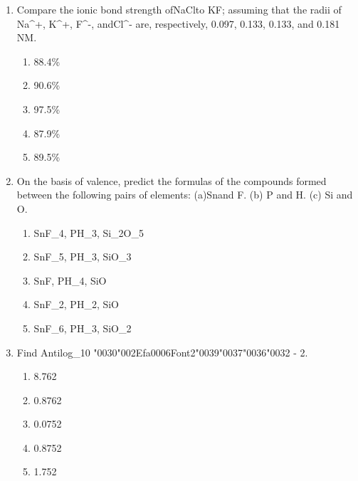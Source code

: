 \documentclass[12pt]{article}
\begin{document}
\begin{enumerate}[label=\arabic*.]
\begin{enumerate}[label=(\alph*)]
    \item T-shaped
    \item Trigonal planar
    \item Trigonal bipyramidal
\end{enumerate}
\item Compare the ionic bond strength ofNaClto KF; assuming that the radii of Na\^{}+, K\^{}+, F\^{}-,
andCl\^{}- are, respectively, 0.097, 0.133, 0.133, and 0.181 NM.
\begin{enumerate}[label=(\alph*)]
    \item 88.4\%
    \item 90.6\%
    \item 97.5\%
    \item 87.9\%
    \item 89.5\%
\end{enumerate}
\item On the basis of valence, predict the formulas of the compounds formed between the
following pairs of elements: (a)Snand F. (b) P and H. (c) Si and O.
\begin{enumerate}[label=(\alph*)]
    \item SnF\_4, PH\_3, Si\_2O\_5
    \item SnF\_5, PH\_3, SiO\_3
    \item SnF, PH\_4, SiO
    \item SnF\_2, PH\_2, SiO
    \item SnF\_6, PH\_3, SiO\_2
\end{enumerate}
\item Find Antilog\_10 {\char"0030}{\char"002E}{\csname fa0006Font2\endcsname\char"0039}{\char"0037}{\char"0036}{\char"0032} - 2.
\begin{enumerate}[label=(\alph*)]
    \item 8.762
    \item 0.8762
    \item 0.0752
    \item 0.8752
    \item 1.752
\end{enumerate}
\end{enumerate}
\end{document}
